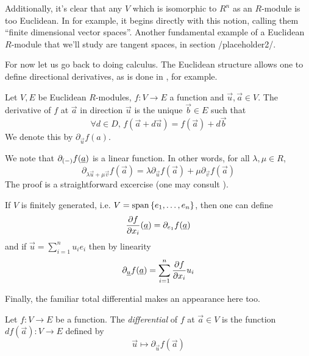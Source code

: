 Additionally, it's clear that any \( V \) which is isomorphic to \( R^n \) as an \( R \)-module is too Euclidean. In \cite{kock10} for example, it begins directly with this notion, calling them ``finite dimensional vector spaces''. Another fundamental example of a Euclidean \( R \)-module that we'll study are tangent spaces, in section {/placeholder2/}.

For now let us go back to doing calculus. The Euclidean structure allows one to define directional derivatives, as is done in \cite{lav96}, for example.
\begin{defn}
  Let \( V,E \) be Euclidean \( R \)-modules, \( f:V\to E \) a function and \( \vec u, \vec a\in V \). The derivative of \( f \) at \( \vec a \) in direction \( \vec u \) is the unique \( \vec b\in E \) such that
  \begin{equation*}
    \forall d\in D,\, f(\vec a + d\vec u) = f(\vec a) + d\vec b
  \end{equation*}
  We denote this by \( \partial_{\vec u}f(a) \). 
\end{defn}

We note that \( \partial_{(-)}f(\underline a) \) is a linear function. In other words, for all \( \lambda,\mu \in R\),
\begin{equation*}
  \partial_{\lambda \vec u + \mu \vec v}f(\vec a) = \lambda\partial_{\vec u}f(\vec a) + \mu\partial_{\vec v}f(\vec a)
\end{equation*}
The proof is a straightforward excercise (one may consult \cite[p. 13]{lav96}).

If \( V \) is finitely generated, i.e. \( V = \operatorname{span}{\{e_1,\dots,e_n\}} \), then one can define
\begin{equation*}
  \frac{\partial f}{\partial x_i}(\underline a) = \partial_{e_1}f(\underline a)
\end{equation*}
and if \( \vec u = \sum_{i=1}^{n}{u_ie_i} \) then by linearity
\begin{equation*}
  \partial_{\underline u}f(\underline a) = \sum_{i=1}^{n}\frac{\partial f}{\partial x_i}u_i
\end{equation*}

Finally, the familiar total differential makes an appearance here too.

\begin{defn}
  Let \( f:V\to E \) be a function. The \emph{differential} of \( f \) at \( \vec a\in V \) is the function \( df(\vec a):V\to E \) defined by
  \begin{equation*}
    \vec u\mapsto \partial_{\vec u}f(\vec a)
  \end{equation*}
  \label{def:df(a)}
\end{defn}

